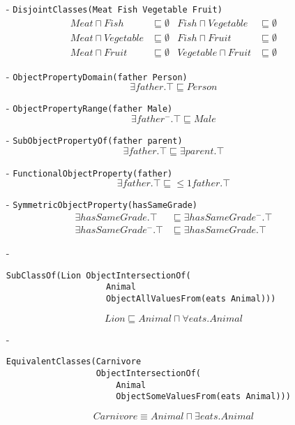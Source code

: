 \documentclass[a4paper,12pt]{article}
\begin{document}
\begin{itemize}
\item[-]\verb|DisjointClasses(Meat Fish Vegetable Fruit)|
\begin{align*}
 Meat      \sqcap Fish      &\sqsubseteq \emptyset
&Fish      \sqcap Vegetable &\sqsubseteq \emptyset \\
 Meat      \sqcap Vegetable &\sqsubseteq \emptyset
&Fish      \sqcap Fruit     &\sqsubseteq \emptyset \\
 Meat      \sqcap Fruit     &\sqsubseteq \emptyset
&Vegetable \sqcap Fruit     &\sqsubseteq \emptyset
\end{align*}

\item[-]\verb|ObjectPropertyDomain(father Person)|
\begin{equation*}
\exists father.\top \sqsubseteq Person
\end{equation*}

\item[-]\verb|ObjectPropertyRange(father Male)|
\begin{equation*}
\exists father^-.\top \sqsubseteq Male
\end{equation*}

\item[-]\verb|SubObjectPropertyOf(father parent)|
\begin{equation*}
\exists father.\top \sqsubseteq \exists parent.\top
\end{equation*}

\item[-]\verb|FunctionalObjectProperty(father)|
\begin{equation*}
\exists father.\top \sqsubseteq {}\leq 1father.\top
\end{equation*}

\item[-]\verb|SymmetricObjectProperty(hasSameGrade)|
\begin{align*}
\exists hasSameGrade.\top   &\sqsubseteq \exists hasSameGrade^-.\top\\
\exists hasSameGrade^-.\top &\sqsubseteq \exists hasSameGrade.\top
\end{align*}

\item[-]\begin{Verbatim}[samepage=true]
SubClassOf(Lion ObjectIntersectionOf(
                    Animal
                    ObjectAllValuesFrom(eats Animal)))
\end{Verbatim}
\begin{equation*}
Lion \sqsubseteq Animal \sqcap \forall eats.Animal
\end{equation*}

\item[-]\begin{Verbatim}[samepage=true]
EquivalentClasses(Carnivore
                  ObjectIntersectionOf(
                      Animal
                      ObjectSomeValuesFrom(eats Animal)))
\end{Verbatim}
\begin{equation*}
Carnivore \equiv Animal \sqcap \exists eats.Animal
\end{equation*}
\end{itemize}
\end{document}
